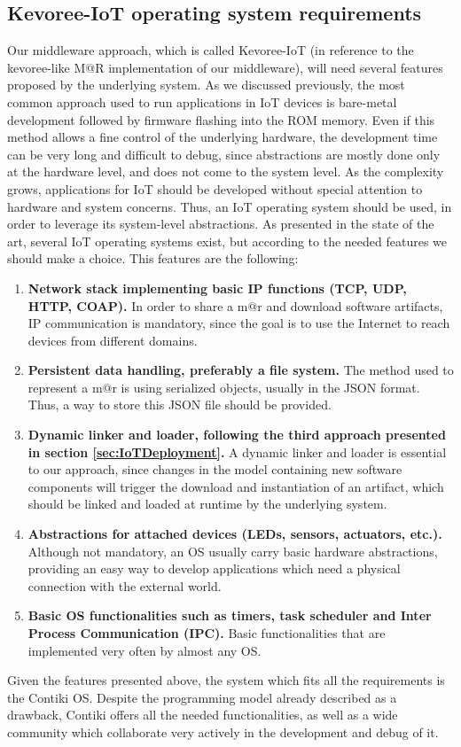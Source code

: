 \subsection{Kevoree-IoT operating system requirements}
Our middleware approach, which is called Kevoree-IoT (in reference to the kevoree-like M@R implementation of our middleware), will need several features proposed by the underlying system.
As we discussed previously, the most common approach used to run applications in IoT devices is bare-metal development followed by firmware flashing into the ROM memory.
Even if this method allows a fine control of the underlying hardware, the development time can be very long and difficult to debug, since abstractions are mostly done only at the hardware level, and does not come to the system level.
As the complexity grows, applications for IoT should be developed without special attention to hardware and system concerns.
Thus, an IoT operating system should be used, in order to leverage its system-level abstractions.
As presented in the state of the art, several IoT operating systems exist, but according to the needed features we should make a choice.
This features are the following:
\begin{enumerate}
	\item \textbf{Network stack implementing basic IP functions (TCP, UDP, HTTP, COAP).} In order to share a m@r and download software artifacts, IP communication is mandatory, since the goal is to use the Internet to reach devices from different domains.
	\item \textbf{Persistent data handling, preferably a file system.} The method used to represent a m@r is using serialized objects, usually in the JSON format. Thus, a way to store this JSON file should be provided.
	\item \textbf{Dynamic linker and loader, following the third approach presented in section \ref{sec:IoTDeployment}.} A dynamic linker and loader is essential to our approach, since changes in the model containing new software components will trigger the download and instantiation of an artifact, which should be linked and loaded at runtime by the underlying system.
	\item \textbf{Abstractions for attached devices (LEDs, sensors, actuators, etc.).} Although not mandatory, an OS usually carry basic hardware abstractions, providing an easy way to develop applications which need a physical connection with the external world.
	\item \textbf{Basic OS functionalities such as timers, task scheduler and Inter Process Communication (IPC).} Basic functionalities that are implemented very often by almost any OS.
\end{enumerate}
Given the features presented above, the system which fits all the requirements is the Contiki OS.
Despite the programming model already described as a drawback, Contiki offers all the needed functionalities, as well as a wide community which collaborate very actively in the development and debug of it.

